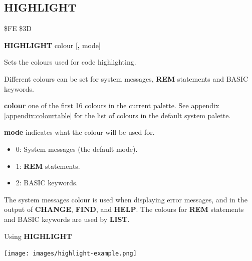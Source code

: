 \subsection{HIGHLIGHT}
\begin{description}[leftmargin=2cm,style=nextline]
\item [Token:]    \$FE \$3D

\item [Format:]   {\bf HIGHLIGHT} colour [{\bf,} mode]

\item [Usage:]    Sets the colours used for code highlighting.

                  Different colours can be set for system messages, {\bf REM} statements and BASIC keywords.

                  {\bf colour} one of the first 16 colours in the current palette. See appendix \vref{appendix:colourtable} for the list of colours in the default system palette.

                  {\bf mode} indicates what the colour will be used for.
                  \begin{itemize}
                     \item 0: System messages (the default mode).
                     \item 1: {\bf REM} statements.
                     \item 2: BASIC keywords.
                  \end{itemize}

\item [Remarks:]  The system messages colour is used when displaying error messages, and in the output of {\bf CHANGE}, {\bf FIND}, and {\bf HELP}. The colours for {\bf REM} statements and BASIC keywords are used by {\bf LIST}.

\item [Example:]  Using {\bf HIGHLIGHT}

\item \begin{center}\texttt{[image: images/highlight-example.png]}\end{center}

\end{description}


\newpage
